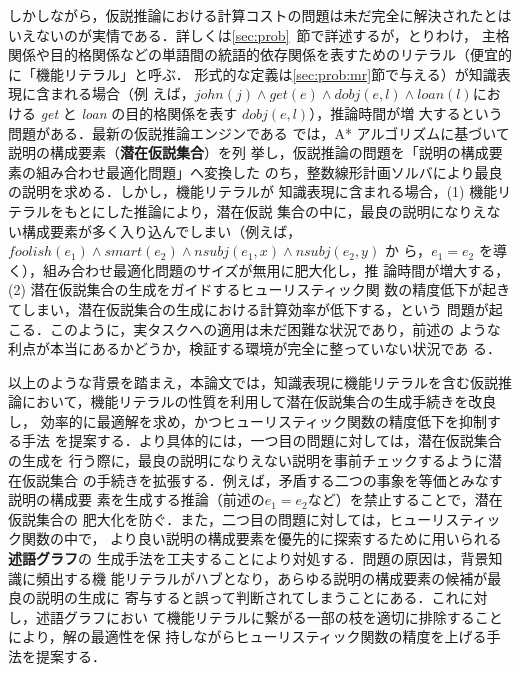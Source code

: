 \documentclass[japanese]{jnlp_1.4}
\begin{document}
しかしながら，仮説推論における計算コストの問題は未だ完全に解決されたとは
いえないのが実情である．詳しくは\ref{sec:prob}~節で詳述するが，とりわけ，
主格関係や目的格関係などの単語間の統語的依存関係を表すためのリテラル（便宜的に「機能リテラル」と呼ぶ．
形式的な定義は\ref{sec:prob:mr}節で与える）が知識表現に含まれる場合（例
えば，$\mathit{john}(j) \land \mathit{get}(e) \land \mathit{dobj}(e,l) \land \mathit{loan}(l)$における
\textit{get} と \textit{loan} の目的格関係を表す $\mathit{dobj}(e,l)$），推論時間が増
大するという問題がある．最新の仮説推論エンジンである \cite{Yamamoto15}
では，A* アルゴリズムに基づいて説明の構成要素（\textbf{潜在仮説集合}）を列
挙し，仮説推論の問題を「説明の構成要素の組み合わせ最適化問題」へ変換した
のち，整数線形計画ソルバにより最良の説明を求める．しかし，機能リテラルが
知識表現に含まれる場合，(1) 機能リテラルをもとにした推論により，潜在仮説
集合の中に，最良の説明になりえない構成要素が多く入り込んでしまい（例えば，
$\mathit{foolish}(e_1) \land \mathit{smart}(e_2) \land \mathit{nsubj}(e_1,x) \land \mathit{nsubj}(e_2,y)$ か
ら，$e_1=e_2$ を導く），組み合わせ最適化問題のサイズが無用に肥大化し，推
論時間が増大する，(2) 潜在仮説集合の生成をガイドするヒューリスティック関
数の精度低下が起きてしまい，潜在仮説集合の生成における計算効率が低下する，という
問題が起こる．このように，実タスクへの適用は未だ困難な状況であり，前述の
ような利点が本当にあるかどうか，検証する環境が完全に整っていない状況であ
る．

以上のような背景を踏まえ，本論文では，知識表現に機能リテラルを含む仮説推
論において，機能リテラルの性質を利用して潜在仮説集合の生成手続きを改良し，
効率的に最適解を求め，かつヒューリスティック関数の精度低下を抑制する手法
を提案する．より具体的には，一つ目の問題に対しては，潜在仮説集合の生成を
行う際に，最良の説明になりえない説明を事前チェックするように潜在仮説集合
の手続きを拡張する．例えば，矛盾する二つの事象を等価とみなす説明の構成要
素を生成する推論（前述の$e_1=e_2$など）を禁止することで，潜在仮説集合の
肥大化を防ぐ．また，二つ目の問題に対しては，ヒューリスティック関数の中で，
より良い説明の構成要素を優先的に探索するために用いられる\textbf{述語グラフ}の
生成手法を工夫することにより対処する．問題の原因は，背景知識に頻出する機
能リテラルがハブとなり，あらゆる説明の構成要素の候補が最良の説明の生成に
寄与すると誤って判断されてしまうことにある．これに対し，述語グラフにおい
て機能リテラルに繋がる一部の枝を適切に排除することにより，解の最適性を保
持しながらヒューリスティック関数の精度を上げる手法を提案する．
\end{document}
